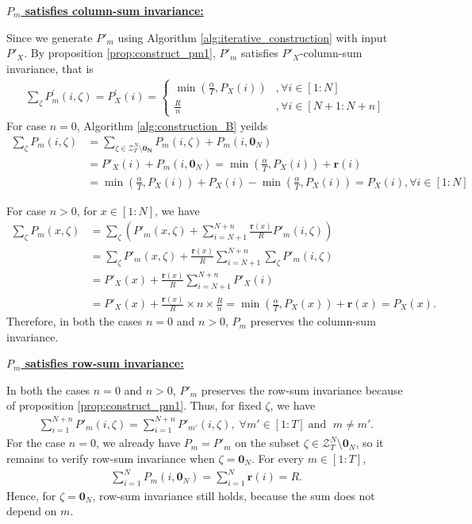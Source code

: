 \documentclass[11pt,letterpaper]{article}
\newcommand{\cZ}{\mathcal{Z}}
\begin{document}
\underline{\textbf{$P_m$ satisfies column-sum invariance:}}

Since we generate $P'_m$ using Algorithm \ref{alg:iterative_construction} with input $P'_X$. By proposition \ref{prop:construct_pm1}, $P'_m$ satisfies $P'_X$-column-sum invariance, that is 
\begin{align}
   \sum_{\zeta } P^{\prime }_{m}(i,\zeta )=P^{\prime }_{X}(i)=\begin{cases}\min (\tfrac{\alpha }{T} ,P_{X}(i))&,\forall i\in [1:N]\\ \frac{R}{n} &,\forall i\in [N+1:N+n]\end{cases}  
\end{align}
For case $n=0$, Algorithm \ref{alg:construction_B} yeilds
\begin{align*}
   \sum_{\zeta } P_{m}(i,\zeta ) & = \sum_{\zeta \in \cZ^N_T \setminus \mathbf{0_N} } P_{m}(i,\zeta )+ P_{m}(i,\mathbf{0}_N)  \\
   & = P'_X(i)+ P_{m}(i,\mathbf{0}_N) = \min (\tfrac{\alpha }{T} ,P_{X}(i)) + \boldsymbol{r}(i) \\
   & = \min (\tfrac{\alpha }{T} ,P_{X}(i)) + P_X(i) - \min (\tfrac{\alpha }{T} ,P_{X}(i)) = P_X(i), \forall i \in [1:N] 
\end{align*} 

For case $n > 0$, for $x \in [1:N]$, we have 
\begin{align*}
   \sum_{\zeta } P_{m}(x,\zeta ) &= \sum_{\zeta } \left( P'_{m}(x,\zeta ) + \sum_{i=N+1}^{N+n} \tfrac{\boldsymbol{r}(x)}{R}P'_{m}(i,\zeta )\right) \\
   & = \sum_{\zeta }P'_{m}(x,\zeta ) +  \tfrac{\boldsymbol{r}(x)}{R} \sum_{i=N+1}^{N+n}\sum_{\zeta }P'_{m}(i,\zeta ) \\
   & = P'_X(x) +  \tfrac{\boldsymbol{r}(x)}{R} \sum_{i=N+1}^{N+n}P'_X(i) \\
   & = P'_X(x) +  \tfrac{\boldsymbol{r}(x)}{R}\times n \times \tfrac{R}{n} = \min (\tfrac{\alpha }{T} ,P_{X}(x)) + \boldsymbol{r}(x) = P_X(x). 
\end{align*}
Therefore, in both the cases $n=0$ and $n>0$, $P_m$ preserves the column-sum invariance.

\underline{\textbf{$P_m$ satisfies row-sum invariance:}}

In both the cases $n=0$ and $n>0$, $P'_m$ preserves the row-sum invariance because of proposition \ref{prop:construct_pm1}. Thus, for fixed $\zeta$, we have 
\begin{align}
    \sum_{i = 1}^{N+n} P'_m(i,\zeta) = \sum_{i = 1}^{N+n} P'_{m'}(i,\zeta), \; \forall m' \in [1:T] \;  \text{and } \; m \neq m'.
\end{align}
For the case $n=0$, we already have $P_m = P'_m$ on the subset $\zeta \in \cZ^N_T \setminus \mathbf{0}_N$, so it remains to verify row-sum invariance when $\zeta = \mathbf{0}_N$. For every $m \in [1:T]$,
\begin{align}
    \sum_{i=1}^N P_m(i,\mathbf{0}_N) = \sum_{i=1}^N \boldsymbol{r}(i) = R.
\end{align}
Hence, for $\zeta = \mathbf{0}_N$, row-sum invariance still holds, because the sum does not depend on $m$.
\end{document}
